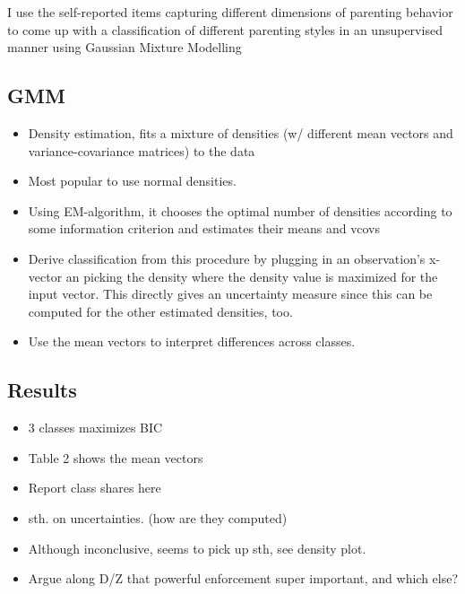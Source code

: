 I use the self-reported items capturing different dimensions of parenting behavior to come up with a classification of different parenting styles in an unsupervised manner using Gaussian Mixture Modelling

\subsection{GMM}
\begin{itemize}
	\item Density estimation, fits a mixture of densities (w/ different mean vectors and variance-covariance matrices) to the data
	\item Most popular to use normal densities.
	\item Using EM-algorithm, it chooses the optimal number of densities according to some information criterion
	and estimates their means and vcovs 
	\item Derive classification from this procedure by plugging in an observation's x-vector an picking the density where the density value is maximized for the input vector. This directly gives an uncertainty measure since this can be computed for the other estimated densities, too. 
	\item Use the mean vectors to interpret differences across classes.
\end{itemize}

\subsection{Results}
\begin{itemize}
	\item 3 classes maximizes BIC
	\item Table 2 shows the mean vectors
	\item Report class shares here
	\item sth. on uncertainties. (how are they computed)
	\item Although inconclusive, seems to pick up sth, see density plot.
	\item Argue along D/Z that powerful enforcement super important, and which else?
\end{itemize}
